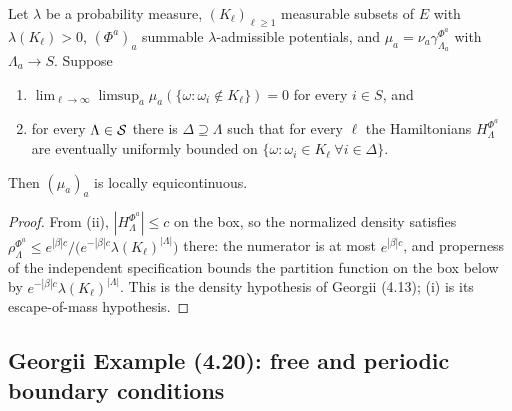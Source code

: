 \begin{corollary}
    \label{cor:exg-4-13}
    \leanok

    Let $\lambda$ be a probability measure, $(K_\ell)_{\ell\ge1}$ measurable subsets of $E$
    with $\lambda(K_\ell)>0$, $(\Phi^a)_a$ summable $\lambda$-admissible potentials, and
    $\mu_a=\nu_a\gamma^{\Phi^a}_{\Lambda_a}$ with $\Lambda_a\to S$. Suppose
    \begin{enumerate}
        \item $\lim_{\ell\to\infty}\limsup_a\mu_a(\{\omega:\omega_i\notin K_\ell\})=0$ for
              every $i\in S$, and
        \item for every $\Lambda\in\mathcal{S}$ there is $\Delta\supseteq\Lambda$ such that for every
              $\ell$ the Hamiltonians $H^{\Phi^a}_\Lambda$ are eventually uniformly bounded on
              $\{\omega:\omega_i\in K_\ell\ \forall i\in\Delta\}$.
    \end{enumerate}
    Then $(\mu_a)_a$ is locally equicontinuous.
\end{corollary}
\begin{proof}
    \leanok

    From (ii), $|H^{\Phi^a}_\Lambda|\le c$ on the box, so the normalized density satisfies
    $\rho^{\Phi^a}_\Lambda\le e^{|\beta|c}\big/\big(e^{-|\beta|c}\lambda(K_\ell)^{|\Lambda|}\big)$
    there: the numerator is at most $e^{|\beta|c}$, and properness of the independent
    specification bounds the partition function on the box below by
    $e^{-|\beta|c}\lambda(K_\ell)^{|\Lambda|}$. This is the density hypothesis of Georgii
    (4.13); (i) is its escape-of-mass hypothesis.
\end{proof}

\subsection*{Georgii Example (4.20): free and periodic boundary conditions}

